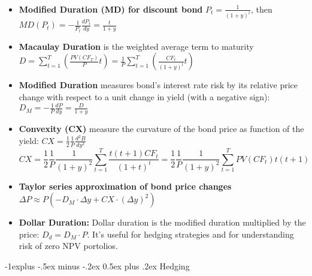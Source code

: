 \documentclass[10pt,landscape,a4paper]{article}
\makeatletter
\renewcommand{\subsection}{\@startsection{subsection}{2}{0mm}%
                                {-1explus -.5ex minus -.2ex}%
                                {0.5ex plus .2ex}%
                                {\normalfont\normalsize\bfseries}}
\makeatother
\begin{document}
\begin{multicols*}{3}
\begin{description}[topsep=0pt]
	\item[Duration and Convexity] ~
	\begin{itemize}[topsep=0pt]
	\item {\bf Modified Duration (MD) for discount bond} $ P_t=\frac{1}{(1+y)^t} $, then $ MD(P_t) = -\frac{1}{P_t}\frac{dP_t}{dy} = \frac{t}{1+y}$
		\item {\bf Macaulay Duration} is the weighted average term to maturity  $ D = \sum_{t=1}^{T} \left(   \frac{PV(CF_T)}{P}  t \right)  =   \frac{1}{P}\sum_{t=1}^{T} \left(  \frac{CF_t}{(1+y)^t} t \right)  $
		\item {\bf Modified Duration} measures bond's interest rate risk by its relative price change with respect
		to a unit change in yield (with a negative sign):  $ D_M =  -\frac{1}{P}\frac{dP}{dy}  = \frac{D}{1+y}  $
		\item {\bf Convexity (CX)} measure the curvature of the bond price as function of the yield:  $ CX =  \frac{1}{2}\frac{1}{P}\frac{d^2B}{dy^2}  $ \\
		$$ CX = \frac{1}{2} \frac{1}{P} \frac{1}{(1+y)^2} \sum_{t=1}^{T} \frac{t (t+1) CF_t}{(1+t)^t} =  \frac{1}{2} \frac{1}{P} \frac{1}{(1+y)^2} \sum_{t=1}^{T} PV(CF_t) t (t+1)  $$
		\item {\bf Taylor series approximation of bond price changes}  $ \Delta P \approx  P \left(  -D_M  \cdot \Delta y + CX \cdot ( \Delta y)^2 \right)    $
		\item {\bf Dollar Duration:} Dollar duration is the modified duration multiplied by the price: $D_d = D_M \cdot P$. It's useful for hedging strategies and for understanding risk of zero NPV portolios.
	\end{itemize}
\end{description}

\subsection{Hedging}


\end{multicols*}
\end{document}
